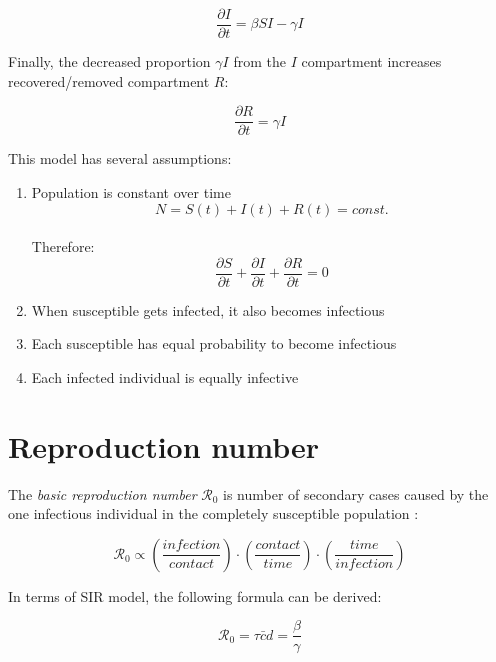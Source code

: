 \documentclass[
  digital, %
  table,   %
  twoside, %
  12pt,
  lof,     %
  lot,     %
]{fithesis3}
\begin{document}
\begin{equation}
	\frac{\partial{I}}{\partial{t}} = \beta S I - \gamma I
\end{equation}

Finally, the decreased proportion $\gamma I$ from the 
$I$ compartment increases recovered/removed compartment $R$:

\begin{equation}
	\frac{\partial{R}}{\partial{t}} = \gamma I
\end{equation}

This model has several assumptions:

\begin{enumerate}
  \item Population is constant over time \\
    \begin{equation}
      N = S(t) + I(t) + R(t) = const.
    \end{equation} \\
    Therefore: \\
    \begin{equation}
      \frac{\partial{S}}{\partial{t}} + \frac{\partial{I}}{\partial{t}} + \frac{\partial{R}}{\partial{t}} = 0
    \end{equation}
  \item When susceptible gets infected, it also becomes infectious
  \item Each susceptible has equal probability to become infectious
  \item Each infected individual is equally infective \cite{volz2018}
\end{enumerate}

\section{Reproduction number}

The \textit{basic reproduction number} $\mathcal{R}_0$ is number 
of secondary cases caused by the one infectious individual 
in the completely susceptible population \cite{jones2007}:

\begin{equation}
	\mathcal{R}_0 \propto \left(\frac{infection}{contact}\right)\cdot\left(\frac{contact}{time}\right)\cdot\left(\frac{time}{infection}\right)  
\end{equation}

In terms of SIR model, the following formula can be derived:

\begin{equation}
	\mathcal{R}_0 = \tau\bar{c}d = \frac{\beta}{\gamma}
\end{equation}
\end{document}
